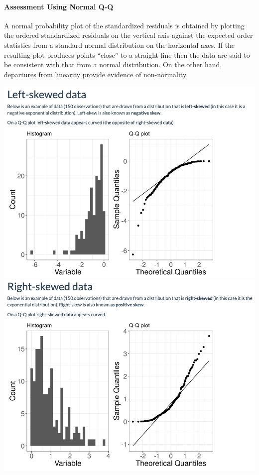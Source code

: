 \documentclass[11pt]{article}
\begin{document}
\paragraph{Assessment Using Normal Q-Q}
A normal probability plot of the standardized residuals is obtained by plotting the ordered standardized residuals on the vertical axis against the expected order statistics from a standard normal distribution on the horizontal axes. If the resulting plot produces points ``close'' to a straight line then the data are said to be consistent with that from a normal distribution. On the other hand, departures from linearity provide evidence of non-normality. 
\begin{center}
    \includegraphics[scale=0.27]{img/qq_left.png}
    \includegraphics[scale=0.27]{img/qq_right.png}

\end{center}
\end{document}
